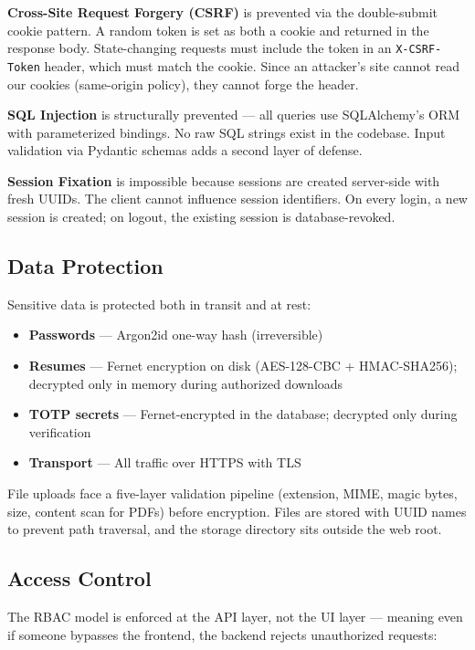 \textbf{Cross-Site Request Forgery (CSRF)} is prevented via the double-submit cookie pattern. A random token is set as both a cookie and returned in the response body. State-changing requests must include the token in an \texttt{X-CSRF-Token} header, which must match the cookie. Since an attacker's site cannot read our cookies (same-origin policy), they cannot forge the header.

\textbf{SQL Injection} is structurally prevented — all queries use SQLAlchemy's ORM with parameterized bindings. No raw SQL strings exist in the codebase. Input validation via Pydantic schemas adds a second layer of defense.

\textbf{Session Fixation} is impossible because sessions are created server-side with fresh UUIDs. The client cannot influence session identifiers. On every login, a new session is created; on logout, the existing session is database-revoked.

\subsection{Data Protection}

Sensitive data is protected both in transit and at rest:

\begin{itemize}
    \item \textbf{Passwords} — Argon2id one-way hash (irreversible)
    \item \textbf{Resumes} — Fernet encryption on disk (AES-128-CBC + HMAC-SHA256); decrypted only in memory during authorized downloads
    \item \textbf{TOTP secrets} — Fernet-encrypted in the database; decrypted only during verification
    \item \textbf{Transport} — All traffic over HTTPS with TLS
\end{itemize}

File uploads face a five-layer validation pipeline (extension, MIME, magic bytes, size, content scan for PDFs) before encryption. Files are stored with UUID names to prevent path traversal, and the storage directory sits outside the web root.

\subsection{Access Control}

The RBAC model is enforced at the API layer, not the UI layer — meaning even if someone bypasses the frontend, the backend rejects unauthorized requests:

